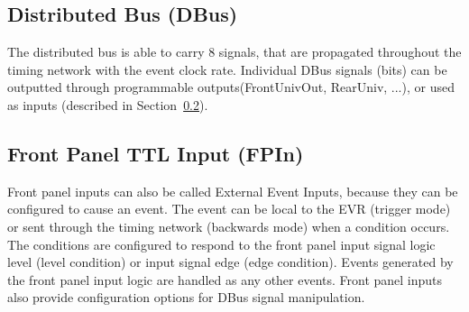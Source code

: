 \documentclass[12pt,a4paper]{article}
\begin{document}
\subsection{Distributed Bus (DBus)}\label{sec:DBus}
The distributed bus is able to carry 8 signals, that are propagated throughout the timing network with the event clock rate. Individual DBus signals (bits) can be outputted through programmable outputs(FrontUnivOut, RearUniv, ...), or used as inputs (described in Section~\ref{sec:Front Panel TTL Input}).


\subsection{Front Panel TTL Input (FPIn)}\label{sec:Front Panel TTL Input}
Front panel inputs can also be called External Event Inputs, because they can be configured to cause an event. The event can be local to the EVR (trigger mode) or sent through the timing network (backwards mode) when a condition occurs. The conditions are configured to respond to the front panel input signal logic level (level condition) or input signal edge (edge condition). Events generated by the front panel input logic are handled as any other events. Front panel inputs also provide configuration options for DBus signal manipulation.
\end{document}

